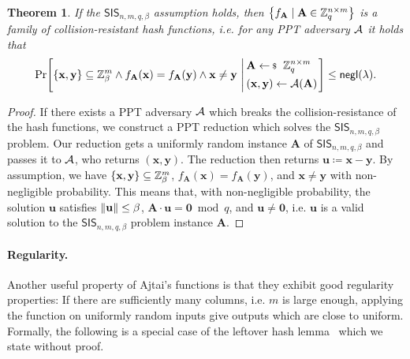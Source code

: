 \documentclass[10pt,twoside]{article}
\newcounter{lecnum}
\newtheorem{theorem}{Theorem}[lecnum]
\renewcommand{\vec}[1]{\mathbf{#1}}
\newcommand{\mat}[1]{\mathbf{#1}}
\newcommand{\SIS}{\mathsf{SIS}}
\begin{document}
\begin{theorem}
    If the $\SIS_{n,m,q,\beta}$ assumption holds, then $\set{f_{\mat{A}} \mid \mat{A} \in \ZZ_q^{n \times m}}$ is a family of collision-resistant hash functions, i.e. for any PPT adversary $\mathcal{A}$ it holds that
    \[
        \condprob{\set{\vec{x}, \vec{y}} \subseteq \ZZ_\beta^m \land f_{\mat{A}}(\vec{x}) = f_{\mat{A}}(\vec{y}) \land \vec{x} \neq \vec{y}}{
            \begin{aligned}
                &\mat{A} \sample \ZZ_q^{n \times m} \\
                &(\vec{x}, \vec{y}) \gets \adv(\mat{A})
            \end{aligned}
        }
        \leq \negl.
    \]
\end{theorem}

\begin{proof}
    If there exists a PPT adversary $\mathcal{A}$ which breaks the collision-resistance of the hash functions, we construct a PPT reduction which solves the $\SIS_{n,m,q,\beta}$ problem.
    Our reduction gets a uniformly random instance $\mat{A}$ of $\SIS_{n,m,q,\beta}$ and passes it to $\mathcal{A}$, who returns $(\vec{x}, \vec{y})$.
    The reduction then returns $\vec{u} \coloneqq \vec{x} - \vec{y}$.
    By assumption, we have $\set{\vec{x}, \vec{y}} \subseteq \ZZ_\beta^m$, $f_{\mat{A}}(\vec{x}) = f_{\mat{A}}(\vec{y})$, and $\vec{x} \neq \vec{y}$ with non-negligible probability.
    This means that, with non-negligible probability, the solution $\vec{u}$ satisfies $\norm{\vec{u}} \leq \beta$, $\mat{A} \cdot \vec{u} = \vec{0} \bmod q$, and $\vec{u} \neq \vec{0}$, i.e. $\vec{u}$ is a valid solution to the $\SIS_{n,m,q,\beta}$ problem instance $\mat{A}$.
\end{proof}

\paragraph*{Regularity.}

Another useful property of Ajtai's functions is that they exhibit good regularity properties:
If there are sufficiently many columns, i.e. $m$ is large enough, applying the function on uniformly random inputs give outputs which are close to uniform.
Formally, the following is a special case of the leftover hash lemma~\cite{STOC:ImpLevLub89} which we state without proof.
\end{document}
